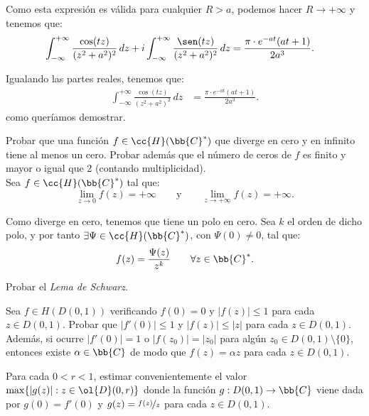 \documentclass[12pt]{article}
\begin{document}
\begin{ejercicio}[2.5 puntos]
        Como esta expresión es válida para cualquier $R > a$, podemos hacer $R \to +\infty$ y tenemos que:
        \begin{align*}
            \int_{-\infty}^{+\infty} \frac{\cos(t z)}{(z^2 + a^2)^2} \, dz + i\int_{-\infty}^{+\infty} \frac{\sen(t z)}{(z^2 + a^2)^2} \, dz &= \frac{\pi\cdot e^{-at}(at + 1)}{2a^3}.
        \end{align*}

        Igualando las partes reales, tenemos que:
        \begin{align*}
            \int_{-\infty}^{+\infty} \frac{\cos(t z)}{(z^2 + a^2)^2} \, dz &= \frac{\pi\cdot e^{-at}(at + 1)}{2a^3}.
        \end{align*}
        como queríamos demostrar.
    \end{ejercicio}

    \begin{ejercicio}[2.5 puntos]
        Probar que una función $f \in \cc{H}(\bb{C}^*)$ que diverge en cero y en infinito tiene al menos un cero. Probar además que el número de ceros de $f$ es finito y mayor o igual que 2 (contando multiplicidad).\\

        Sea $f \in \cc{H}(\bb{C}^*)$ tal que:
        \begin{equation*}
            \lim_{z\to 0} f(z) = +\infty \qquad \text{y} \qquad \lim_{z\to +\infty} f(z) = +\infty.
        \end{equation*}

        Como diverge en cero, tenemos que tiene un polo en cero. Sea $k$ el orden de dicho polo, y por tanto $\exists \Psi\in \cc{H}(\bb{C}^*)$, con $\Psi(0)\neq 0$, tal que:
        \begin{equation*}
            f(z) = \frac{\Psi(z)}{z^k} \qquad \forall z\in \bb{C}^*.
        \end{equation*}

    \end{ejercicio}

    \begin{ejercicio}[2.5 puntos]
        Probar el \emph{Lema de Schwarz}.
        \begin{lema*}[de Schwarz]
            Sea $f \in H(D(0, 1))$ verificando $f(0) = 0$ y $|f(z)| \leq 1$ para cada $z \in D(0, 1)$. Probar que $|f'(0)| \leq 1$ y $|f(z)| \leq |z|$ para cada $z \in D(0, 1)$. Además, si ocurre $|f'(0)| = 1$ o $|f(z_0)| = |z_0|$ para algún $z_0 \in D(0, 1) \setminus \{0\}$, entonces existe $\alpha \in \bb{C}$ de modo que $f(z) = \alpha z$ para cada $z \in D(0, 1)$.
        \end{lema*}
        \begin{observacion}
            Para cada $0 < r < 1$, estimar convenientemente el valor $\max\{ |g(z)| : z \in \ol{D}(0, r) \}$ donde la función $g : D(0, 1) \to \bb{C}$ viene dada por $g(0) = f'(0)$ y $g(z) = \nicefrac{f(z)}{z}$ para cada $z \in D(0, 1)$.
        \end{observacion}
    \end{ejercicio}
    
\end{document}
